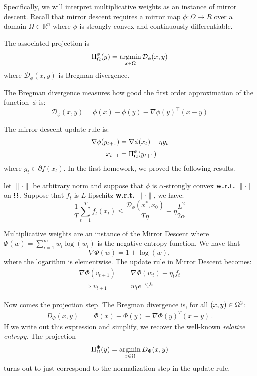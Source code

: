 Specifically, we will interpret multiplicative weights as an instance of mirror
descent.  Recall that mirror descent requires a mirror map $\phi : \Omega \to R$
over a domain $\Omega \in \mathbb{R}^n$ where $\phi$ is strongly convex and
continuously differentiable.

The associated projection is
\begin{equation*}
    \Pi^\phi_\Omega (y) = \mathop{\rm argmin}_{x\in\Omega} \mathcal{D}_\phi(x,y)
\end{equation*}
where $\mathcal{D}_\phi(x,y)$ is Bregman divergence.
\begin{definition}
The Bregman divergence measures how good the first order approximation of the
function~$\phi$ is:
    \begin{equation*}
        \mathcal{D}_\phi(x,y) = \phi(x) - \phi(y) - \nabla \phi(y) ^\intercal (x-y)
    \end{equation*}
\end{definition}
The mirror descent update rule is:
\begin{align*}
    \nabla \phi(y_{t+1}) &= \nabla \phi (x_t) - \eta g_t \\
    x_{t+1} &=  \Pi^\phi_\Omega (y_{t+1})
\end{align*}
where $g_t \in \partial f(x_t).$ 
In the first homework, we proved the following results.
\begin{theorem}
    let $\|\cdot\|$ be arbitrary norm and suppose that $\phi$ is $\alpha$-strongly convex      \textbf{w.r.t.} $\|\cdot\|$ on $\Omega$. Suppose that $f_t$ is $L$-lipschitz \textbf{w.r.t.} $\|\cdot\|$, we have:
    \begin{equation*}
        \frac{1}{T}\sum^T_{t=1} f_t(x_t) \leq \frac{ \mathcal{D}_\phi(x^*,x_0)}{T \eta}+ \eta \frac{L^2}{2\alpha}
    \end{equation*}
\end{theorem}


Multiplicative weights are an instance of the Mirror Descent where $\Phi(w)=
\sum_{i=1}^m w_i \log(w_i)$ is the negative entropy function.
We have that
\[
\nabla\Phi(w) =  1 + \log(w),
\]
where the logarithm is elementwise.
The update rule in Mirror Descent becomes:
\begin{align*}
    \nabla\Phi(v_{t+1}) &=\nabla\Phi(w_{t}) - \eta_tf_t \\
    \implies v_{t+1} &= w_te^{-\eta_t f_t}
\end{align*}

Now comes the projection step. The Bregman divergence is, for all $(x,y)\in\Omega^2$:
\begin{align*}
    D_{\Phi}(x,y) &= \Phi(x)-\Phi(y) - \nabla\Phi(y)^T(x-y)\,.
\end{align*}
If we write out this expression and simplify, we recover the well-known
\emph{relative entropy}. The projection
\begin{align*}
    \Pi_{\Omega}^{\Phi}(y) = \mathop{\rm argmin}_{x\in\Omega}D_{\Phi}(x,y)
\end{align*}
turns out to just correspond to the normalization step in the update rule.

